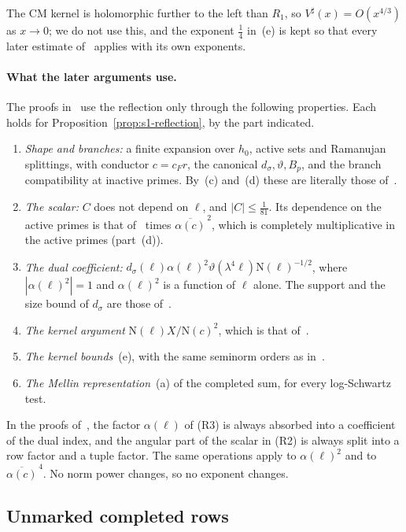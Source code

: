 \documentclass[11pt]{article}
\numberwithin{equation}{section}
\newcommand{\N}{\mathrm N}
\begin{document}
The CM kernel is holomorphic further to the left than $R_1$, so $V^\sharp(x)=O(x^{4/3})$ as $x\to0$; we do not use
this, and the exponent $\frac14$ in~(e) is kept so that every later estimate of~\cite{OAI78} applies with its own
exponents.

\paragraph{What the later arguments use.} The proofs in~\cite[Sections~5.2--5.5, Sections~14--15]{OAI78} use the reflection
only through the following properties. Each holds for Proposition~\ref{prop:s1-reflection}, by the part indicated.
\begin{enumerate}
\item[(R1)] \emph{Shape and branches:} a finite expansion over $h_0$, active sets and Ramanujan splittings, with
 conductor $c=c_Fr$, the canonical $d_\sigma,\vartheta,B_p$, and the branch compatibility at inactive primes. By~(c) and~(d)
 these are literally those of~\cite{OAI78}.
\item[(R2)] \emph{The scalar:} $C$ does not depend on $\ell$, and $|C|\le\frac1{81}$. Its dependence on the active
 primes is that of~\cite{OAI78} times $\overline{\alpha(c)}^{\,2}$, which is completely multiplicative in the active
 primes (part~(d)).
\item[(R3)] \emph{The dual coefficient:} $d_\sigma(\ell)\alpha(\ell)^2\vartheta(\lambda^4\ell)\N(\ell)^{-1/2}$, where
 $|\alpha(\ell)^2|=1$ and $\alpha(\ell)^2$ is a function of $\ell$ alone. The support and the size bound of $d_\sigma$
 are those of~\cite{OAI78}.
\item[(R4)] \emph{The kernel argument} $\N(\ell)X/\N(c)^2$, which is that of~\cite{OAI78}.
\item[(R5)] \emph{The kernel bounds}~(e), with the same seminorm orders as in~\cite{OAI78}.
\item[(R6)] \emph{The Mellin representation}~(a) of the completed sum, for every log-Schwartz test.
\end{enumerate}
In the proofs of~\cite{OAI78}, the factor $\alpha(\ell)$ of (R3) is always absorbed into a coefficient of the dual
index, and the angular part of the scalar in (R2) is always split into a row factor and a tuple factor. The same
operations apply to $\alpha(\ell)^2$ and to $\overline{\alpha(c)}^{\,4}$. No norm power changes, so no exponent changes.

\subsection{Unmarked completed rows}\label{sec:s1-unmarked}
\end{document}
